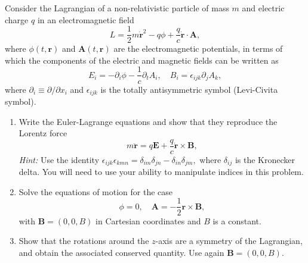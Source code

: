 \documentclass{jhwhw}
\begin{document}

Consider the Lagrangian of a non-relativistic particle of mass $m$ and electric charge $q$ in an electromagnetic field
\begin{equation}
  \label{eq:3}
  L = \frac12 m \dot{\mathbf r}^{2} - q \phi + \frac{q}{c} \dot{\mathbf r } \cdot \mathbf A,
\end{equation}
where $\phi(t, \mathbf r)$ and $\mathbf A(t, \mathbf r)$ are the electromagnetic potentials, in terms of which the components of the electric and magnetic fields can be written as
\begin{equation}
  \label{eq:4}
  E_{i} = -\partial_{i} \phi - \frac1c \partial_{t} A_{i}, \quad B_{i} = \epsilon_{ijk} \partial_{j} A_{k},
\end{equation}
where $\partial_{i} \equiv \partial/ \partial x_{i}$ and $\epsilon_{ijk }$ is the totally antisymmetric symbol (Levi-Civita symbol).
\begin{enumerate}
  \item Write the Euler-Lagrange equations and show that they reproduce the Lorentz force
        \begin{equation}
          \label{eq:5}
          m \ddot{\mathbf r} = q \mathbf E + \frac{q}{c} \dot{\mathbf r} \times \mathbf B,
        \end{equation}
  \emph{Hint:} Use the identity $\epsilon_{ijk}\epsilon_{kmn} = \delta_{im} \delta_{jn} - \delta_{in} \delta_{jm}, $ where $\delta_{ij}$ is the Kronecker delta. You will need to use your ability to manipulate indices in this problem.
  \item Solve the equations of motion for the case
        \begin{equation}
          \label{eq:6}
          \phi = 0, \quad \mathbf A = - \frac12 \mathbf r \times \mathbf B,
        \end{equation}
        with $\mathbf B = (0,0,B)$ in Cartesian coordinates and $B$ is a constant.
  \item Show that the rotations around the $z$-axis are a symmetry of the Lagrangian, and obtain the associated conserved quantity. Use again $\mathbf B = (0,0,B)$.
\end{enumerate}
\end{document}
